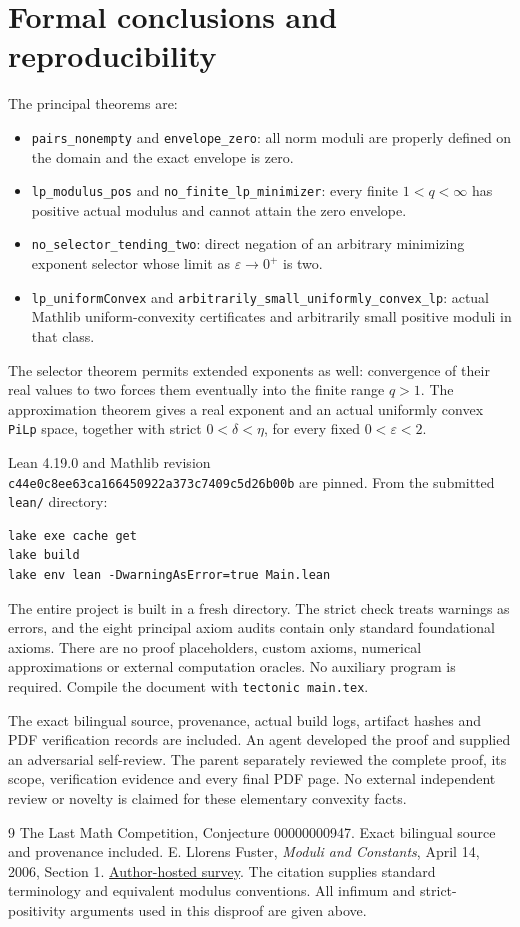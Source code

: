 \documentclass[11pt]{article}
\begin{document}
\newpage
\section*{Formal conclusions and reproducibility}
The principal theorems are:
\begin{itemize}
\item \texttt{pairs\_nonempty} and
\texttt{envelope\_zero}: all norm moduli are properly
defined on the domain and the exact envelope is zero.
\item \texttt{lp\_modulus\_pos} and
\texttt{no\_finite\_lp\_minimizer}: every finite
$1<q<\infty$ has positive actual modulus and cannot
attain the zero envelope.
\item \texttt{no\_selector\_tending\_two}: direct
negation of an arbitrary minimizing exponent selector
whose limit as $\varepsilon\to0^+$ is two.
\item \texttt{lp\_uniformConvex} and
\texttt{arbitrarily\_small\_uniformly\_convex\_lp}:
actual Mathlib uniform-convexity certificates and
arbitrarily small positive moduli in that class.
\end{itemize}
The selector theorem permits extended exponents as well:
convergence of their real values to two forces them
eventually into the finite range $q>1$. The approximation
theorem gives a real exponent and an actual uniformly
convex \texttt{PiLp} space, together with strict
$0<\delta<\eta$, for every fixed $0<\varepsilon<2$.

Lean 4.19.0 and Mathlib revision\\
\texttt{c44e0c8ee63ca166450922a373c7409c5d26b00b}
are pinned. From the submitted \texttt{lean/} directory:
\begin{verbatim}
lake exe cache get
lake build
lake env lean -DwarningAsError=true Main.lean
\end{verbatim}
The entire project is built in a fresh directory. The
strict check treats warnings as errors, and the eight
principal axiom audits contain only standard foundational
axioms. There are no proof placeholders, custom axioms,
numerical approximations or external computation oracles.
No auxiliary program is required. Compile the document
with \texttt{tectonic main.tex}.

The exact bilingual source, provenance, actual build
logs, artifact hashes and PDF verification records are
included. An agent developed the proof and supplied an
adversarial self-review. The parent separately reviewed
the complete proof, its scope, verification evidence and
every final PDF page. No external independent review or
novelty is claimed for these elementary convexity facts.

\begin{thebibliography}{9}
 The Last Math Competition, Conjecture
00000000947. Exact bilingual source and provenance included.
 E. Llorens Fuster,
\emph{Moduli and Constants}, April 14, 2006, Section 1.
\href{https://www.uv.es/~llorens/Documento.pdf}{Author-hosted survey}.
The citation supplies standard terminology and equivalent
modulus conventions. All infimum and strict-positivity
arguments used in this disproof are given above.
\end{thebibliography}
\end{document}

